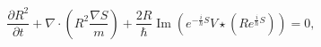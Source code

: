 \begin{equation}
\frac{\partial R^{2}}{\partial t}+\nabla\cdot\left(  R^{2}\frac{\nabla S}%
{m}\right)  +\frac{2R}{\hbar}\operatorname{Im}\left(  e^{-\frac{i}{\hbar}%
S}V\star(Re^{\frac{i}{\hbar}S})\right)  =0,\label{44}%
\end{equation}

